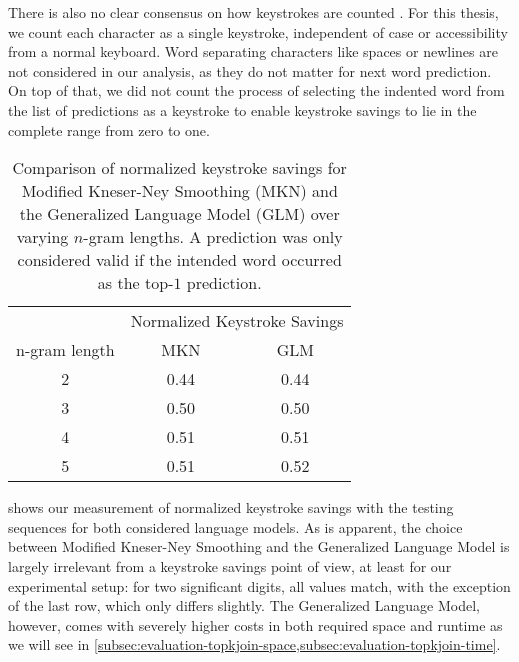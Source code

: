 There is also no clear consensus on how keystrokes are counted
\parencite{Trnka2011}.
For this thesis, we count each character as a single keystroke, independent of
case or accessibility from a normal keyboard.
Word separating characters like spaces or newlines are not considered in our
analysis, as they do not matter for next word prediction.
On top of that, we did not count the process of selecting the indented word from
the list of predictions as a keystroke to enable keystroke savings to lie in the
complete range from zero to one.

\begin{table}
  \centering
  \begin{tabular}{ccc}
    \toprule
    & \multicolumn{2}{c}{Normalized Keystroke Savings} \\
    \cmidrule{2-3}
    n-gram length & \hspace{0.8cm}MKN\hspace{0.8cm} & \hspace{0.8cm}GLM\hspace{0.8cm} \\
    \midrule
    2 & 0.44 & 0.44 \\
    3 & 0.50 & 0.50 \\
    4 & 0.51 & 0.51 \\
    5 & 0.51 & 0.52 \\
    \bottomrule
  \end{tabular}
  \caption{Comparison of normalized keystroke savings for Modified Kneser-Ney
    Smoothing (MKN) and the Generalized Language Model (GLM) over varying
    $n$-gram lengths.
    A prediction was only considered valid if the intended word occurred as
    the top-$1$ prediction.}
  \label{tab:evaluation-nkss}
\end{table}

 shows our measurement of normalized keystroke
savings with the testing sequences for both considered language models.
As is apparent, the choice between Modified Kneser-Ney Smoothing and the
Generalized Language Model is largely irrelevant from a keystroke savings point
of view, at least for our experimental setup: for two significant  digits, all
values match, with the exception of the last row, which only differs slightly.
The Generalized Language Model, however, comes with severely higher costs in
both required space and runtime as we will see in
\cref{subsec:evaluation-topkjoin-space,subsec:evaluation-topkjoin-time}.

\clearpage
